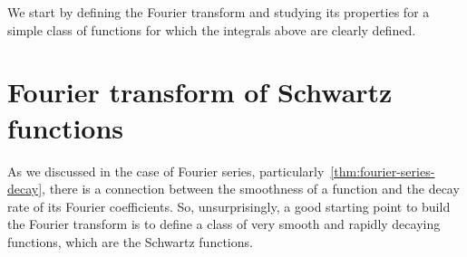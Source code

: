 We start by defining the Fourier transform and studying its properties for a simple class
of functions for which the integrals above are clearly defined.
\section{Fourier transform of Schwartz functions}
As we discussed in the case of Fourier series,
particularly~\cref{thm:fourier-series-decay}, there is a connection between the
smoothness of a function and the decay rate of its Fourier coefficients. So,
unsurprisingly, a good starting point to build the Fourier transform is to define a class
of very smooth and rapidly decaying functions, which are the Schwartz functions.

